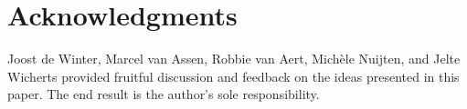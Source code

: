 \section*{Acknowledgments}
Joost de Winter, Marcel van Assen, Robbie van Aert, Michèle Nuijten, and Jelte Wicherts provided fruitful discussion and feedback on the ideas presented in this paper. The end result is the author's sole responsibility.
  